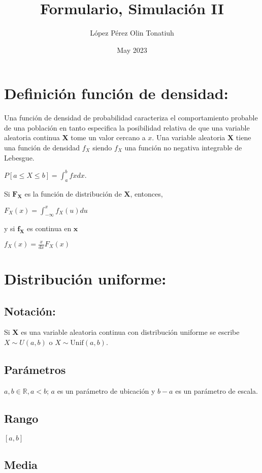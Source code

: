 \documentclass[es-lat]{article}
\title{Formulario, Simulación II}
\author{López Pérez Olin Tonatiuh}
\date{May 2023}
\begin{document}
\maketitle

\section{Definición función de densidad:}
Una función de densidad de probabilidad caracteriza el comportamiento probable de una población en tanto especifica la posibilidad relativa de que una variable aleatoria continua \textbf{X} tome un valor cercano a $x$. Una variable aleatoria \textbf{X} tiene una función de densidad $f_X$ siendo $f_X$ una función no negativa integrable de Lebesgue.\smallskip

$P[a\leq X\leq b]=\int_{a}^{b}fxdx$.\smallskip

\noindent Si $\mathbf{F_X}$ es la función de distribución de $\mathbf{X}$, entonces,\smallskip

$F_{X}(x)=\int_{-\infty }^{x}f_{X}(u)du$\smallskip

\noindent y si $\mathbf{f_{X}}$ es continua en $\mathbf{x}$\smallskip

$f_{X}(x)=\frac{x}{dx}F_{X}(x)$

\section{Distribución uniforme:}

\subsection{Notación:}
Si \textbf{X} es una variable aleatoria continua con distribución uniforme se escribe $X\sim U(a,b)$ o $X\sim\text{Unif}(a,b)$.

\subsection{Parámetros}

$a,b\in\mathbb{R}, a<b$; $a$ es un parámetro de ubicación y $b-a$ es un parámetro de escala.

\subsection{Rango}

$[a,b]$

\subsection{Media}
\end{document}

